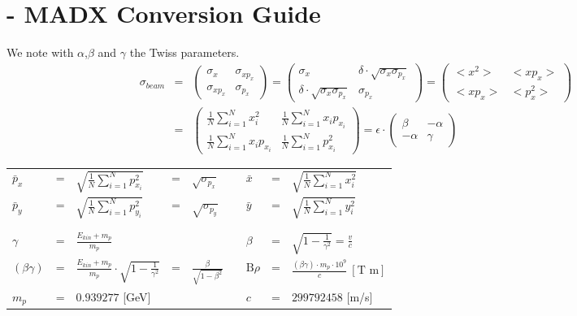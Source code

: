 
\chapter{\opal - MADX Conversion Guide}
We note with $\alpha$,$\beta$ and $\gamma$ the Twiss parameters.
\begin{eqnarray*}
\sigma_{beam} &=& \begin{pmatrix}\sigma_{x} & \sigma_{x p_{x}}\\\sigma_{x p_{x}} &  \sigma_{ p_{x}}\end{pmatrix}
= \begin{pmatrix} \sigma_{x} & \delta\cdot\sqrt{\sigma_{x}\sigma_{ p_{x}}}\\\delta\cdot\sqrt{\sigma_{x}\sigma_{ p_{x}}} & \sigma_{ p_{x}}\end{pmatrix}
= \begin{pmatrix} <x^{2}> & <x p_{x}>\\<x p_{x}> & < p_{x}^{2}> \end{pmatrix} \\
&=& \begin{pmatrix}
  \frac{1}{N}\sum_{i=1}^{N}x_{i}^{2} & \frac{1}{N}\sum_{i=1}^{N}x_{i} p_{x_{i}}\\
  \frac{1}{N}\sum_{i=1}^{N}x_{i} p_{x_{i}} & \frac{1}{N}\sum_{i=1}^{N} p_{x_{i}}^{2}
 \end{pmatrix}
= \epsilon\cdot\begin{pmatrix} \beta & -\alpha\\ -\alpha & \gamma\end{pmatrix}
\end{eqnarray*}

\begin{tabular}{l l l l l c l l l}
$\bar{p}_{x}$ & = & $\sqrt{\frac{1}{N}\sum_{i=1}^{N} p_{x_{i}}^{2}}$ & = & $\sqrt{\sigma_{ p_{x}}}$ & & $\bar{x}$ & = & $\sqrt{\frac{1}{N}\sum_{i=1}^{N}x_{i}^{2}}$ \\

$\bar{p}_{y}$ & = & $\sqrt{\frac{1}{N}\sum_{i=1}^{N}p_{y_{i}}^{2}}$ & = & $\sqrt{\sigma_{p_{y}}}$ & & $\bar{y}$ & = & $\sqrt{\frac{1}{N}\sum_{i=1}^{N}y_{i}^{2}}$ \\\\\\

$\gamma$ & = & $\frac{E_{kin}+m_{p}}{m_{p}}$ & & & & $\beta$ & = & $\sqrt{1-\frac{1}{\gamma^{2}}} = \frac{v}{c}$\\

$(\beta\gamma)$ & = & $\frac{E_{kin}+m_{p}}{m_{p}}\cdot\sqrt{1-\frac{1}{\gamma^{2}}}$& = & $\frac{\beta}{\sqrt{1-\beta^{2}}}$ & & $\text{B}\rho$ & = & $\frac{\left(\beta\gamma\right)\cdot m_{p}\cdot 10^{9}}{c}~\left[\text{T m}\right]$\\

$m_{p}$ & = & $0.939277$ [GeV] & & & & $c$ & = & $299792458
$ [m/s]\\
\end{tabular}

